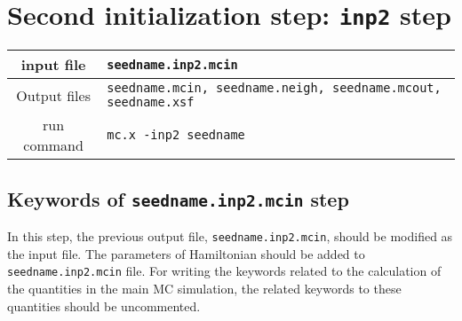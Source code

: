 \documentclass[10pt]{report}
\begin{document}
\section{Second initialization step: {\tt inp2} step}
\begin{center}
\begin{tabular}{|c|p{10cm}|}
\toprule
\hline
input file   & {\tt seedname.inp2.mcin}\\
\hline
Output files & {\tt seedname.mcin, seedname.neigh, seedname.mcout, seedname.xsf}\\
\hline
run command  & {\tt mc.x -inp2 seedname}\\
\hline
\bottomrule
\end{tabular}
\end{center}
\subsection{Keywords of {\tt seedname.inp2.mcin} step}
In this step, 
the previous output file, {\tt seedname.inp2.mcin}, should be modified as the input file.
The parameters of Hamiltonian should be added to {\tt seedname.inp2.mcin} file.
For writing the keywords related to the calculation of the quantities in the main MC simulation,
the related keywords to these quantities should be uncommented.
\end{document}

